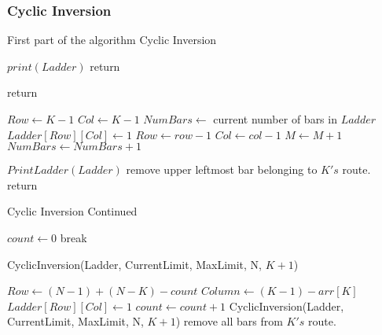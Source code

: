 \subsubsection{Cyclic Inversion}
\begin{algorithm}
  \caption{First part of the algorithm Cyclic Inversion}
  \begin{algorithmic}[1]


      
        \State $print(Ladder)$
        \State return
      \EndIf

        \State return
      \EndIf


      \State $Row \gets K-1$
      \State $Col \gets K-1$
      \State $NumBars \gets$ current number of bars in $Ladder$
        \State $Ladder[Row][Col] \gets 1$
        \State $Row \gets row-1$
        \State $Col \gets col-1$
        \State $M \gets M+1$
        \State $NumBars \gets NumBars+1$
      \EndWhile

        \State $PrintLadder(Ladder)$
      \EndIf
      \State remove upper leftmost bar belonging to $K's$ route.
      \State return


  \end{algorithmic}
\end{algorithm}

\begin{algorithm}
  \caption{Cyclic Inversion Continued}
    \begin{algorithmic}[1]

    \Else 
      \State $count \gets 0$
            \State break
        \EndIf

          \State CyclicInversion(Ladder, CurrentLimit, MaxLimit, N, $K+1$)
      
       
        
        \Else
          \State $Row \gets (N-1) + (N-K) - count$
          \State $Column \gets (K-1)-arr[K]$
          \State $Ladder[Row][Col] \gets 1$
          \State $count \gets count + 1$
          \State CyclicInversion(Ladder, CurrentLimit, MaxLimit, N, $K+1$)
        \EndIf
      \EndFor
      \State remove all bars from $K's$ route.

    \EndIf
    \EndFunction
  \end{algorithmic}
\end{algorithm}


